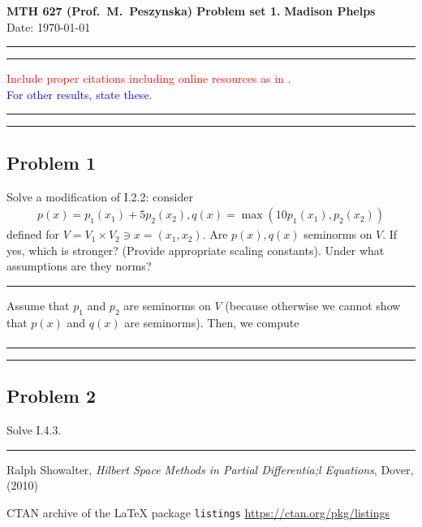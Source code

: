 \documentclass[12pt]{amsart}
\begin{document}
\noindent
\textbf{MTH 627 (Prof.~M.~Peszynska) Problem set 1. } \hfill \textbf{Madison Phelps}\\
\hfill Date: \today\\
\medskip
\hrule
\hrule
\medskip
\noindent
\textcolor{red}{Include  proper citations including online resources as in  \cite[Chap.I, Theorem 1.1]{Showalter}. 
} 
\\
\textcolor{blue}{For other results, state these.} 

\medskip
\hrule
\hrule
\medskip
\subsection*{Problem 1}
Solve a modification of I.2.2: consider 
\begin{eqnarray}
p(x)=p_1(x_1)+5p_2(x_2), q(x)=\max(10 p_1(x_1),p_2(x_2))
\end{eqnarray}
defined for $V=V_1 \times V_2 \ni x=(x_1,x_2)$. Are $p(x),q(x)$ seminorms on $V$. If yes, which is stronger? (Provide appropriate scaling constants). Under what assumptions are they norms?  
%
\\
\medskip
\hrule
\medskip
%

Assume that $p_1$ and $p_2$ are seminorms on $V$ (because otherwise we cannot show that $p(x)$ and $q(x)$ are seminorms). Then, we compute
	\begin{align*}
		
	\end{align*} 

\medskip
\hrule
\hrule
\medskip
\subsection*{Problem 2}
Solve I.4.3.
\\
\medskip
\hrule
\medskip
%

\begin{thebibliography}{9}
 Ralph Showalter, \emph{Hilbert Space Methods in Partial Differentia;l Equations}, Dover, (2010)

 CTAN archive of the LaTeX package {\tt listings} \url{https://ctan.org/pkg/listings}
\end{thebibliography}
\end{document}
